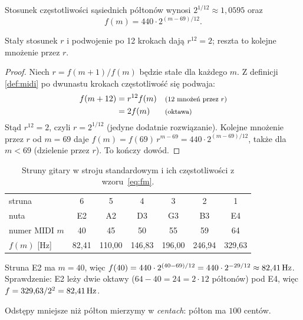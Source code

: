 \begin{twierdzenie}\label{tw:fm}
Stosunek częstotliwości sąsiednich półtonów wynosi $2^{1/12}\approx1{,}0595$ oraz
\begin{equation}
  f(m)=440\cdot2^{(m-69)/12}.
  \label{eq:fm}
\end{equation}
\end{twierdzenie}
\begin{pomyslDowodu}
Stały stosunek $r$ i podwojenie po 12 krokach dają $r^{12}=2$; reszta to kolejne mnożenie przez $r$.
\end{pomyslDowodu}
\begin{proof}
Niech $r=f(m+1)/f(m)$ będzie stałe dla każdego $m$. Z definicji \ref{def:midi} po dwunastu krokach częstotliwość się podwaja:
\begin{align*}
f(m+12) &= r^{12}f(m) && \text{\footnotesize (12 mnożeń przez $r$)}\\
        &= 2f(m)      && \text{\footnotesize (oktawa)}
\end{align*}
Stąd $r^{12}=2$, czyli $r=2^{1/12}$ (jedyne dodatnie rozwiązanie). Kolejne mnożenie przez $r$ od $m=69$ daje
$f(m)=f(69)\,r^{m-69}=440\cdot2^{(m-69)/12}$, także dla $m<69$ (dzielenie przez $r$). To kończy dowód.
\end{proof}

\begin{table}[ht]
\centering\small
\begin{tabular}{@{}lcccccc@{}}
\toprule
struna & 6 & 5 & 4 & 3 & 2 & 1\\
nuta & E2 & A2 & D3 & G3 & B3 & E4\\
numer MIDI $m$ & 40 & 45 & 50 & 55 & 59 & 64\\
$f(m)$ [Hz] & 82,41 & 110,00 & 146,83 & 196,00 & 246,94 & 329,63\\
\bottomrule
\end{tabular}
\caption{Struny gitary w stroju standardowym i ich częstotliwości z wzoru~\eqref{eq:fm}.}
\label{tab:struny}
\end{table}

\begin{przyklad}\label{prz:e2}
Struna E2 ma $m=40$, więc $f(40)=440\cdot2^{(40-69)/12}=440\cdot2^{-29/12}\approx82{,}41\,\mathrm{Hz}$. Sprawdzenie:
E2 leży dwie oktawy ($64-40=24=2\cdot12$ półtonów) pod E4, więc $f=329{,}63/2^2=82{,}41\,\mathrm{Hz}$.
\end{przyklad}

Odstępy mniejsze niż półton mierzymy w \emph{centach}: półton ma $100$ centów.

